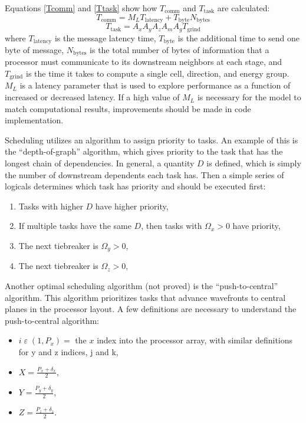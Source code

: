 \documentclass[11pt, letterpaper,titlepage,oneside]{article}
\begin{document}
Equations \ref{Tcomm} and \ref{Ttask} show how $T_{\text{comm}}$ and $T_{\text{task}}$ are calculated:
\begin{equation}
T_{\text{comm}} = M_L T_{\text{latency}} + T_{\text{byte}} N_{\text{bytes}}
\label{Tcomm}
\end{equation}
\begin{equation}
T_{\text{task}} = A_x A_y A_z A_m A_g T_{\text{grind}}
\label{Ttask}
\end{equation}
where $T_{\text{latency}}$ is the message latency time, $T_{\text{byte}}$ is the additional time to send one byte of message, $N_{\text{bytes}}$ is the total number of bytes of information that a processor must communicate to its downstream neighbors at each stage, and $T_{\text{grind}}$ is the time it takes to compute a single cell, direction, and energy group. $M_L$ is a latency parameter that is used to explore performance as a function of increased or decreased latency. If a high value of $M_L$ is necessary for the model to match computational results, improvements should be made in code implementation.

Scheduling utilizes an algorithm to assign priority to tasks. An example of this is the ``depth-of-graph'' algorithm, which gives priority to the task that has the longest chain of dependencies. In general, a quantity $D$ is defined, which is simply the number of downstream dependents each task has. Then a simple series of logicals determines which task has priority and should be executed first:
\begin{enumerate}
\item Tasks with higher $D$ have higher priority,
\item If multiple tasks have the same $D$, then tasks with $\Omega_x > 0$ have priority,
\item The next tiebreaker is $\Omega_y > 0$,
\item The next tiebreaker is $\Omega_z > 0$,
\end{enumerate}

Another optimal scheduling algorithm (not proved) is the ``push-to-central'' algorithm. This algorithm prioritizes tasks that advance wavefronts to central planes in the processor layout. A few definitions are necessary to understand the push-to-central algorithm:
\begin{itemize}
\item $i \; \varepsilon \; (1,P_x) = $ the $x$ index into the processor array, with similar definitions for y and z indices, j and k,
\item $X = \frac{P_x + \delta_x}{2}$,
\item $Y = \frac{P_y + \delta_y}{2}$,
\item $Z = \frac{P_z + \delta_z}{2}$.
\end{itemize}
\end{document}
